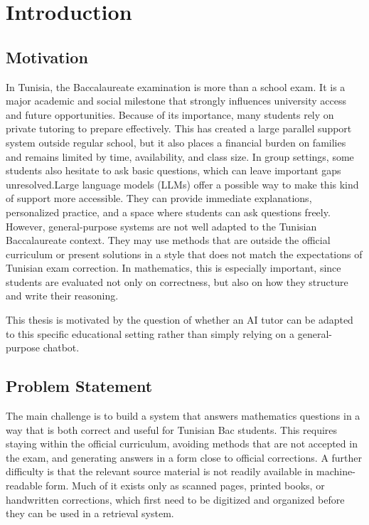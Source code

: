 \chapter{Introduction}
\label{chap:introduction}

\section{Motivation}
In Tunisia, the Baccalaureate examination is more than a school exam. It is a major academic and social milestone that strongly influences university access and future opportunities. Because of its importance, many students rely on private tutoring to prepare effectively. This has created a large parallel support system outside regular school, but it also places a financial burden on families and remains limited by time, availability, and class size. In group settings, some students also hesitate to ask basic questions, which can leave important gaps unresolved.Large language models (LLMs) offer a possible way to make this kind of support more accessible. They can provide immediate explanations, personalized practice, and a space where students can ask questions freely. However, general-purpose systems are not well adapted to the Tunisian Baccalaureate context. They may use methods that are outside the official curriculum or present solutions in a style that does not match the expectations of Tunisian exam correction. In mathematics, this is especially important, since students are evaluated not only on correctness, but also on how they structure and write their reasoning.

This thesis is motivated by the question of whether an AI tutor can be adapted to this specific educational setting rather than simply relying on a general-purpose chatbot.

\section{Problem Statement}
The main challenge is to build a system that answers mathematics questions in a way that is both correct and useful for Tunisian Bac students. This requires staying within the official curriculum, avoiding methods that are not accepted in the exam, and generating answers in a form close to official corrections. A further difficulty is that the relevant source material is not readily available in machine-readable form. Much of it exists only as scanned pages, printed books, or handwritten corrections, which first need to be digitized and organized before they can be used in a retrieval system.

